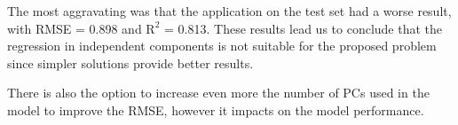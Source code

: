 The most aggravating was that the application on the test set had a worse result, with RMSE = 0.898 and $\text{R}^2$ = 0.813. These results lead us to conclude that the regression in independent components is not suitable for the proposed problem since simpler solutions provide better results.



There is also the option to increase even more the number of PCs used in the model to improve the RMSE, however it impacts on the model performance.





